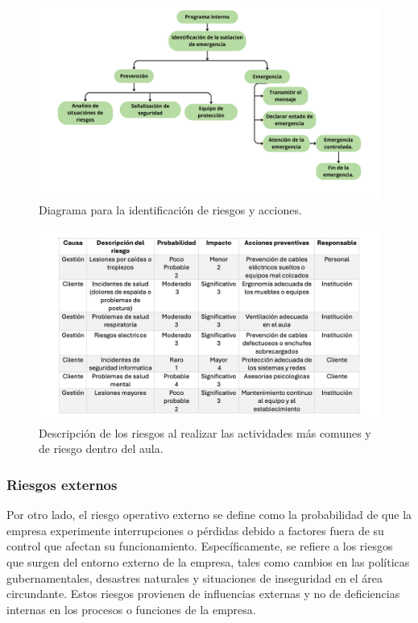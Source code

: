     \begin{figure}[H]
        \centering
        \includegraphics[scale=0.17]{15/img/diagramaIdentifiacionRiesgosAcciones.pdf}
        \caption{Diagrama para la identificación de riesgos y acciones.}
        \label{fig:diagramaIdentificacionRiesgosAcciones}
    \end{figure}
    
    \begin{figure}[H]
        \centering
        \includegraphics[scale=0.17]{15/img/talaRiesgosInternos.pdf}
        \caption{Descripción de los riesgos al realizar las actividades más comunes y de riesgo dentro del aula.}
        \label{fig:tablaRiesgosInternos}
    \end{figure}
    
    \subsubsection{Riesgos externos}
    Por otro lado, el riesgo operativo externo se define como la probabilidad de que la empresa experimente interrupciones o pérdidas debido a factores fuera de su control que afectan su funcionamiento. Específicamente, se refiere a los riesgos que surgen del entorno externo de la empresa, tales como cambios en las políticas gubernamentales, desastres naturales y situaciones de inseguridad en el área circundante. Estos riesgos provienen de influencias externas y no de deficiencias internas en los procesos o funciones de la empresa.
    

